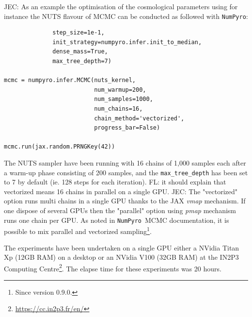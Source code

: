 \documentclass[twocolumn,twocolappendix,nofootinbib,iop]{openjournal}
\newcommand{\FrL}[1]{{\color{cyan}FL: #1}}
\newcommand{\JEC}[1]{{\color{magenta}JEC: #1}}
\newcommand{\numpyro}{\texttt{NumPyro}}
\begin{document}
\JEC{As an example the optimisation of the cosmological parameters using for instance the NUTS flavour of MCMC can be conducted as followed with \numpyro:}
\begin{lstlisting}[language=iPython]
%nuts_kernel = numpyro.infer.NUTS(observed_model,
              step_size=1e-1,
              init_strategy=numpyro.infer.init_to_median,
              dense_mass=True,
              max_tree_depth=7)

mcmc = numpyro.infer.MCMC(nuts_kernel, 
                          num_warmup=200, 
                          num_samples=1000,
                          num_chains=16,
                          chain_method='vectorized',
                          progress_bar=False)

mcmc.run(jax.random.PRNGKey(42))
\end{lstlisting}

The NUTS sampler have been running with 16 chains of 1,000 samples each after a warm-up phase consisting of 200 samples, and the \texttt{max\_tree\_depth} has been set to 7 by default (ie. 128 steps for each iteration). \FrL{it should explain that vectorized means 16 chains in parallel on a single GPU.}
\JEC{The "vectorized" option runs multi chains in a single GPU thanks to the JAX \textit{vmap} mechanism. If one dispose of several GPUs then the "parallel" option using \textit{pmap}  mechanism runs one chain per GPU. As noted in \numpyro\ MCMC documentation, it is possible to mix parallel and vectorized sampling\footnote{Since version 0.9.0.}.}

The experiments have been undertaken on a single GPU either a NVidia Titan Xp (12GB RAM) on a desktop or an NVidia V100 (32GB RAM) at the IN2P3 Computing Centre\footnote{\url{https://cc.in2p3.fr/en/}}. The elapse time for these experiments was 20 hours.
\end{document}
